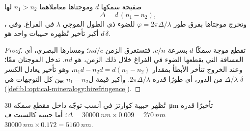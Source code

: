 \begin{proposition}\label{prop:b1:optical-mineralogy:retardation}
صفيحة سمكها $d$ وموجتاها معاملاهما $n_1 > n_2$ لها 
\[
  \Delta = d\,(n_1 - n_2),
\]
وتخرج موجتاها بفرق طور $\varphi = 2\pi\Delta/\lambda$ للضوء ذي الطول الموجي $\lambda$ في الفراغ. وفي ، أكبر تأخير تُظهره حبيبات  واحد هو $d\,\delta$.
\end{proposition}

\begin{proof}
تقطع موجة سمكًا $d$ بسرعة $c/n$، فتستغرق الزمن $nd/c$؛ ومسارها البصري، أي المسافة التي يقطعها الضوء في الفراغ خلال ذلك الزمن، هو $nd$. تدخل الموجتان معًا؛ وعند الخروج تتأخر الأبطأ بمقدار $n_1 d - n_2 d = d(n_1 - n_2)$، وهو تأخير يعادل الكسر $\Delta/\lambda$ من الدور، أي طورًا قدره $2\pi\Delta/\lambda$. وأكبر قيمة ل$n_1 - n_2$ بين كل التوجهات هي $\delta$ (\cref{def:b1:optical-mineralogy:birefringence}).
\end{proof}

تُظهر حبيبة كوارتز في أنسب توجّه داخل مقطع سمكه \qty{30}{\micro m} تأخيرًا قدره $\Delta = \qty{30000}{nm}\times0.009 =
\qty{270}{nm}$؛ أما حبيبة كالسيت ف$\qty{30000}{nm}\times0.172 = \qty{5160}{nm}$.

